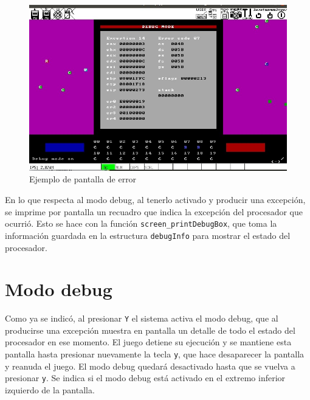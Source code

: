 \documentclass[a4paper]{article}
\begin{document}
\begin{figure}[!htb]
  \begin{center}
	\includegraphics[scale=0.4]{img/modoDebug.png}
	\caption{Ejemplo de pantalla de error}
  \end{center}
\end{figure}

En lo que respecta al modo debug, al tenerlo activado y producir una excepción, se imprime por pantalla un recuadro que indica la excepción del procesador que ocurrió. Esto se hace con la función {\tt screen_printDebugBox}, que toma la información guardada en la estructura {\tt debugInfo} para mostrar el estado del procesador.


\section{Modo debug}
Como ya se indicó, al presionar {\tt Y} el sistema activa el modo debug, que al producirse una excepción muestra en pantalla un detalle de todo el estado del procesador en ese momento. El juego detiene su ejecución y se mantiene esta pantalla hasta presionar nuevamente la tecla {\tt y}, que hace desaparecer la pantalla y reanuda el juego. El modo debug quedará desactivado hasta que se vuelva a presionar {\tt y}. Se indica si el modo debug está activado en el extremo inferior izquierdo de la pantalla.
\end{document}
